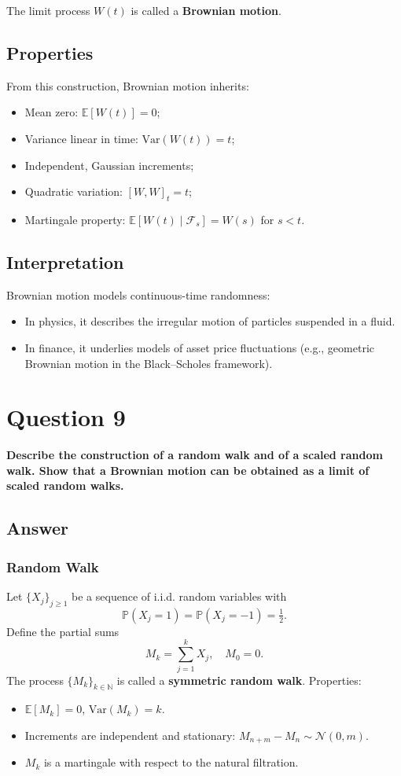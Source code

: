 \documentclass[12pt,a4paper]{book}
\theoremstyle{remark}
\newcommand{\PP}{\mathbb{P}}          %
\newcommand{\EE}{\mathbb{E}}          %
\newcommand{\NN}{\mathbb{N}}
\newcommand{\F}{\mathcal{F}}          %
\newcommand{\Var}{\mathrm{Var}}       %
\newcommand{\Normal}{\mathcal{N}}
\begin{document}
The limit process $W(t)$ is called a \textbf{Brownian motion}.

\subsection*{Properties}
From this construction, Brownian motion inherits:
\begin{itemize}
    \item Mean zero: $\EE[W(t)] = 0$;
    \item Variance linear in time: $\Var(W(t)) = t$;
    \item Independent, Gaussian increments;
    \item Quadratic variation: $[W,W]_t = t$;
    \item Martingale property: $\EE[W(t) \mid \F_s] = W(s)$ for $s < t$.
\end{itemize}

\subsection*{Interpretation}
Brownian motion models continuous-time randomness:
\begin{itemize}
    \item In physics, it describes the irregular motion of particles suspended in a fluid.
    \item In finance, it underlies models of asset price fluctuations (e.g., geometric Brownian motion in the Black--Scholes framework).
\end{itemize}










\newpage
\section{Question 9}
\textbf{Describe the construction of a random walk and of a scaled random walk. Show that a Brownian motion can be obtained as a limit of scaled random walks.}

\subsection*{Answer}

\subsubsection*{Random Walk}
Let $\{X_j\}_{j\geq 1}$ be a sequence of i.i.d. random variables with
\[
\PP(X_j = 1) = \PP(X_j = -1) = \tfrac{1}{2}.
\]
Define the partial sums
\[
M_k = \sum_{j=1}^k X_j, \quad M_0=0.
\]
The process $\{M_k\}_{k\in\NN}$ is called a \textbf{symmetric random walk}.  
Properties:
\begin{itemize}
    \item $\EE[M_k] = 0$, $\Var(M_k) = k$.
    \item Increments are independent and stationary: $M_{n+m}-M_n \sim \Normal(0,m)$.
    \item $M_k$ is a martingale with respect to the natural filtration.
\end{itemize}
\end{document}
